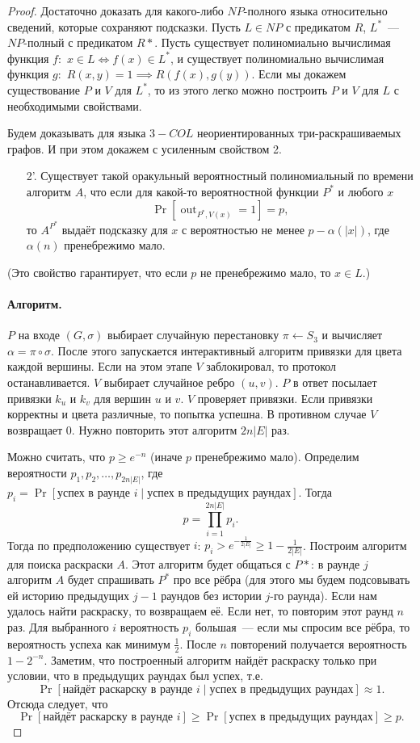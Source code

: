 \documentclass[12pt,a4paper]{article}
\newcommand{\seqn}[2]{{#1}_1,{#1}_2,\dotsc,{#1}_{#2}}
\DeclareMathOperator{\out}{out}
\theoremstyle{definition}
\theoremstyle{plain}
\theoremstyle{remark}
\begin{document}
\begin{proof}
Достаточно доказать для какого-либо $NP$-полного языка относительно сведений,
которые сохраняют подсказки. 
Пусть $L\in NP$ с предикатом $R$,
$L^*$~--- $NP$-полный с предикатом $R*$. Пусть существует полиномиально вычислимая функция $f:$
$x\in L \iff f(x)\in L^*$,
и существует полиномиально вычислимая функция $g:$
$R(x,y) = 1 \implies R(f(x), g(y))$.
Если мы докажем существование $P$ и $V$ для $L^*$, то из этого легко можно построить $P$ и $V$ для $L$ с необходимыми свойствами.

Будем доказывать для языка $3{-}COL$ неориентированных три-раскрашиваемых графов.
И при этом докажем с усиленным свойством 2.
{\em
\begin{itemize}
\item[2'.] Существует такой оракульный вероятностный полиномиальный по времени алгоритм $A$, что если для какой-то вероятностной функции $P^*$ и любого $x$
$$
\Pr[\out_{P^*,V(x)} = 1] = p,
$$
то $A^{P^*}$ выдаёт подсказку для $x$ 
с вероятностью не менее $p - \alpha(|x|)$,
где $\alpha(n)$ пренебрежимо мало.
\end{itemize}}
(Это свойство гарантирует, что если $p$ не пренебрежимо мало, то $x\in L$.)

\paragraph{Алгоритм.} $P$ на входе $(G,\sigma)$ выбирает случайную
перестановку $\pi\gets S_3$ и вычисляет
$\alpha = \pi\circ\sigma$. После этого
запускается интерактивный алгоритм привязки для цвета каждой вершины. Если
на этом этапе $V$ заблокировал, то протокол останавливается. 
$V$ выбирает случайное ребро $(u,v)$.
$P$ в ответ посылает привязки $k_u$ и
$k_v$ для вершин $u$ и $v$.
$V$ проверяет привязки. Если привязки корректны и цвета различные, то попытка успешна. В противном случае $V$ возвращает $0$. Нужно повторить этот алгоритм $2n|E|$ раз.

Можно считать, что $p\ge e^{-n}$ (иначе $p$ пренебрежимо мало). Определим вероятности $\seqn{p}{2n|E|}$, где $p_i = \Pr[\text{успех в раунде $i$}\mid \text{успех в предыдущих раундах}].$ Тогда $$p=\prod_{i=1}^{2n|E|} p_i.$$
Тогда по предположению существует $i$: $p_i> e^{-\frac1{2|E|}}\ge 1 - \frac1{2|E|}$.
Построим алгоритм для поиска раскраски $A$. Этот алгоритм будет общаться с $P*$:
в раунде $j$ алгоритм $A$ будет спрашивать $P^*$ про все рёбра (для этого мы будем
подсовывать ей историю предыдущих $j-1$ раундов без истории $j$-го раунда).
Если нам удалось найти раскраску, то возвращаем её. Если нет, то повторим этот раунд $n$ раз. Для выбранного $i$ вероятность $p_i$ большая~--- если мы спросим все рёбра, то вероятность успеха как минимум $\frac{1}{2}$. После $n$ повторений получается вероятность $1-2^{-n}$. Заметим, что построенный алгоритм найдёт раскраску только при условии, что в предыдущих раундах был успех, т.е. 
$$
\Pr[\text{найдёт раскарску в раунде $i$}\mid \text{успех в предыдущих раундах}] \approx 1.
$$
Отсюда следует, что 
\[
\Pr[\text{найдёт раскарску в раунде $i$}] \ge \Pr[\text{успех в предыдущих раундах}] \ge p.
\]



\end{proof}
\end{document}
